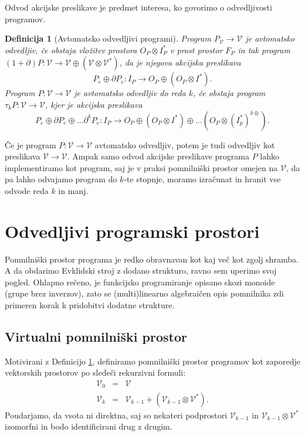 \documentclass[a4paper, 12pt]{book}
\newcommand{\VV}{\mathcal{V}}
\newcommand{\D}{\partial}
\newcommand{\sumd}{\tau}
\newtheorem{definicija}{Definicija}[chapter]
\begin{document}
Odvod akcijske preslikave je predmet interesa, ko govorimo o odvedljivosti programov.
\begin{definicija}[Avtomatsko odvedljivi programi]\label{def:autDef}
Program $P_\VV\to\VV$ je avtomatsko odvedljiv, če obstaja vložitev prostora $O_P\otimes I_P^*$ v prost prostor $F_P$ in tak program $(1+\D )P:\VV\to \VV\oplus(\VV\otimes\VV^*)$, da je njegova akcijska preslikava
\begin{equation}
    \label{eq:program_derivative}
    P_e\oplus \D P_e:I_P\rightarrow O_P\oplus (O_P\otimes I^*).
  \end{equation}
Program $P:\VV\to\VV$ je avtomatsko odvedljiv do reda $k$, če obstaja program $\sumd_k P:\VV\to \VV$, kjer je akcijska preslikava
\begin{equation}
    \label{eq:program_derivative_higher}
    P_e\oplus \D P_e\oplus \ldots \D^k P_e:I_P\rightarrow O_P\oplus \left(O_P\otimes I^*\right)\oplus\ldots \left( O_P\otimes \left( I_p^*\right)^{k\otimes} \right).
  \end{equation}
\end{definicija}

Če je program $P:\VV\to\VV$ avtomatsko odvedljiv, potem je tudi odvedljiv kot preslikava $\VV\to\VV$. Ampak samo odvod akcijske preslikave programa $P$ lahko implementiramo kot program, saj je v praksi pomnilniški prostor omejen na $\VV$, da pa lahko odvajamo program do $k$-te stopnje, moramo izračunat in hranit vse odvode reda $k$ in manj.

\chapter{Odvedljivi programski prostori} \label{ch:OdvProgPros}

Pomnilniški prostor programa je redko obravnavan kot kaj več kot zgolj shramba. A da obdarimo Evklidski stroj z dodano strukturo, ravno sem uperimo svoj pogled. Ohlapno rečeno, je funkcijsko programiranje opisano skozi monoide (grupe brez inverzov), zato se (multi)linearno algebraičen opis pomnilnika zdi primeren korak k pridobitvi dodatne strukture.

\section{Virtualni pomnilniški prostor}

Motivirani z Definicijo \ref{def:autDef}, definiramo pomnilniški prostor programov kot zaporedje vektorskih prostorov po sledeči rekurzivni formuli:
\begin{eqnarray}
  \VV_0 &=& \VV\\
  \label{eq:universal_space}
  \VV_k &=& \VV_{k-1}+\left(\VV_{k-1}\otimes \VV^*\right).
\end{eqnarray}
Poudarjamo, da vsota ni direktna, saj so nekateri podprostori $\VV_{k-1}$ in $\VV_{k-1}\otimes\VV^*$ izomorfni in bodo identificirani drug z drugim.
\end{document}
